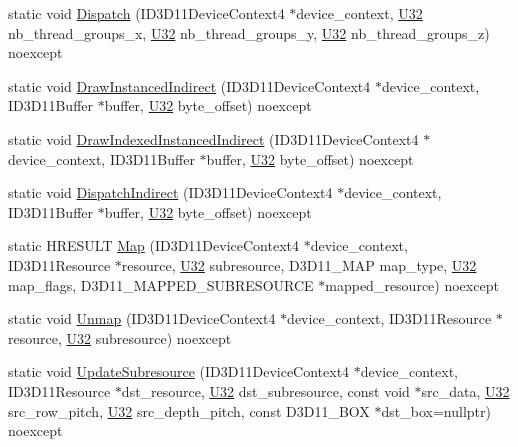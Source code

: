 \begin{DoxyCompactItemize}
\item 
static void \hyperlink{structmage_1_1_pipeline_adbf587e8eaa05254af9ab2ebef909e24}{Dispatch} (I\+D3\+D11\+Device\+Context4 $\ast$device\+\_\+context, \hyperlink{namespacemage_a41c104c036fba3756a74e19f793eeaa1}{U32} nb\+\_\+thread\+\_\+groups\+\_\+x, \hyperlink{namespacemage_a41c104c036fba3756a74e19f793eeaa1}{U32} nb\+\_\+thread\+\_\+groups\+\_\+y, \hyperlink{namespacemage_a41c104c036fba3756a74e19f793eeaa1}{U32} nb\+\_\+thread\+\_\+groups\+\_\+z) noexcept
\item 
static void \hyperlink{structmage_1_1_pipeline_a7140cbf6b635336a63cfbe7e8a1bc8cd}{Draw\+Instanced\+Indirect} (I\+D3\+D11\+Device\+Context4 $\ast$device\+\_\+context, I\+D3\+D11\+Buffer $\ast$buffer, \hyperlink{namespacemage_a41c104c036fba3756a74e19f793eeaa1}{U32} byte\+\_\+offset) noexcept
\item 
static void \hyperlink{structmage_1_1_pipeline_a9c745224f5da42a25aa004a6714745e3}{Draw\+Indexed\+Instanced\+Indirect} (I\+D3\+D11\+Device\+Context4 $\ast$device\+\_\+context, I\+D3\+D11\+Buffer $\ast$buffer, \hyperlink{namespacemage_a41c104c036fba3756a74e19f793eeaa1}{U32} byte\+\_\+offset) noexcept
\item 
static void \hyperlink{structmage_1_1_pipeline_aa9ee7d6319d66bf7f85edc5df1af6729}{Dispatch\+Indirect} (I\+D3\+D11\+Device\+Context4 $\ast$device\+\_\+context, I\+D3\+D11\+Buffer $\ast$buffer, \hyperlink{namespacemage_a41c104c036fba3756a74e19f793eeaa1}{U32} byte\+\_\+offset) noexcept
\item 
static H\+R\+E\+S\+U\+LT \hyperlink{structmage_1_1_pipeline_a5cc20781443e8b188181903f57008622}{Map} (I\+D3\+D11\+Device\+Context4 $\ast$device\+\_\+context, I\+D3\+D11\+Resource $\ast$resource, \hyperlink{namespacemage_a41c104c036fba3756a74e19f793eeaa1}{U32} subresource, D3\+D11\+\_\+\+M\+AP map\+\_\+type, \hyperlink{namespacemage_a41c104c036fba3756a74e19f793eeaa1}{U32} map\+\_\+flags, D3\+D11\+\_\+\+M\+A\+P\+P\+E\+D\+\_\+\+S\+U\+B\+R\+E\+S\+O\+U\+R\+CE $\ast$mapped\+\_\+resource) noexcept
\item 
static void \hyperlink{structmage_1_1_pipeline_a12430259f4e0c73fe770a87e17a4eb5b}{Unmap} (I\+D3\+D11\+Device\+Context4 $\ast$device\+\_\+context, I\+D3\+D11\+Resource $\ast$resource, \hyperlink{namespacemage_a41c104c036fba3756a74e19f793eeaa1}{U32} subresource) noexcept
\item 
static void \hyperlink{structmage_1_1_pipeline_a8d0b596b3a5e3729618053f45e9467d5}{Update\+Subresource} (I\+D3\+D11\+Device\+Context4 $\ast$device\+\_\+context, I\+D3\+D11\+Resource $\ast$dst\+\_\+resource, \hyperlink{namespacemage_a41c104c036fba3756a74e19f793eeaa1}{U32} dst\+\_\+subresource, const void $\ast$src\+\_\+data, \hyperlink{namespacemage_a41c104c036fba3756a74e19f793eeaa1}{U32} src\+\_\+row\+\_\+pitch, \hyperlink{namespacemage_a41c104c036fba3756a74e19f793eeaa1}{U32} src\+\_\+depth\+\_\+pitch, const D3\+D11\+\_\+\+B\+OX $\ast$dst\+\_\+box=nullptr) noexcept

\end{DoxyCompactItemize}
